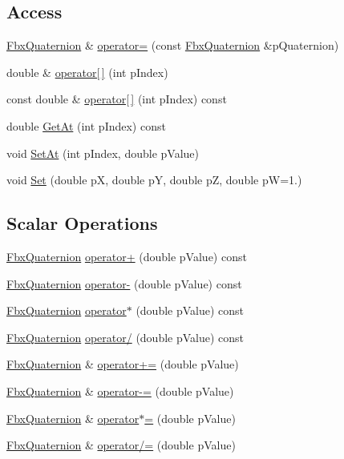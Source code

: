 \subsection*{Access}
\begin{DoxyCompactItemize}
\item 
\hyperlink{class_fbx_quaternion}{Fbx\+Quaternion} \& \hyperlink{class_fbx_quaternion_add741768361b3ffe33c012e6585bc666}{operator=} (const \hyperlink{class_fbx_quaternion}{Fbx\+Quaternion} \&p\+Quaternion)
\item 
double \& \hyperlink{class_fbx_quaternion_ad80dbb6071eb5bf4cfb3b76c14316460}{operator\mbox{[}$\,$\mbox{]}} (int p\+Index)
\item 
const double \& \hyperlink{class_fbx_quaternion_a5d485a6d21257f1a92eca379e3d2e69f}{operator\mbox{[}$\,$\mbox{]}} (int p\+Index) const
\item 
double \hyperlink{class_fbx_quaternion_aa7fe9d4df71f455b8595254aece53842}{Get\+At} (int p\+Index) const
\item 
void \hyperlink{class_fbx_quaternion_aa3695db7955b4c2fcde0385972e160f7}{Set\+At} (int p\+Index, double p\+Value)
\item 
void \hyperlink{class_fbx_quaternion_aa0d19c354c4514760468d9956b140a41}{Set} (double pX, double pY, double pZ, double pW=1.)
\end{DoxyCompactItemize}
\subsection*{Scalar Operations}
\begin{DoxyCompactItemize}
\item 
\hyperlink{class_fbx_quaternion}{Fbx\+Quaternion} \hyperlink{class_fbx_quaternion_a61aa713f7fce6b7eb20e8b809904cf30}{operator+} (double p\+Value) const
\item 
\hyperlink{class_fbx_quaternion}{Fbx\+Quaternion} \hyperlink{class_fbx_quaternion_a1a9ef15dc33423fb804ea30420297328}{operator-\/} (double p\+Value) const
\item 
\hyperlink{class_fbx_quaternion}{Fbx\+Quaternion} \hyperlink{class_fbx_quaternion_ac9874636f9cb288b942dde12308622d5}{operator$\ast$} (double p\+Value) const
\item 
\hyperlink{class_fbx_quaternion}{Fbx\+Quaternion} \hyperlink{class_fbx_quaternion_abd6988e25ac58f06cefc5d4045099cbe}{operator/} (double p\+Value) const
\item 
\hyperlink{class_fbx_quaternion}{Fbx\+Quaternion} \& \hyperlink{class_fbx_quaternion_a445a2cf1c72fe2015d1d4b9bbf0cd4a9}{operator+=} (double p\+Value)
\item 
\hyperlink{class_fbx_quaternion}{Fbx\+Quaternion} \& \hyperlink{class_fbx_quaternion_a1982e4d640a3cf4b9bc4987e7a683a58}{operator-\/=} (double p\+Value)
\item 
\hyperlink{class_fbx_quaternion}{Fbx\+Quaternion} \& \hyperlink{class_fbx_quaternion_a39a982f059feefbf7ba164af4712cf01}{operator$\ast$=} (double p\+Value)
\item 
\hyperlink{class_fbx_quaternion}{Fbx\+Quaternion} \& \hyperlink{class_fbx_quaternion_a01b691edc7aeac6565987ff372d105c9}{operator/=} (double p\+Value)
\end{DoxyCompactItemize}
